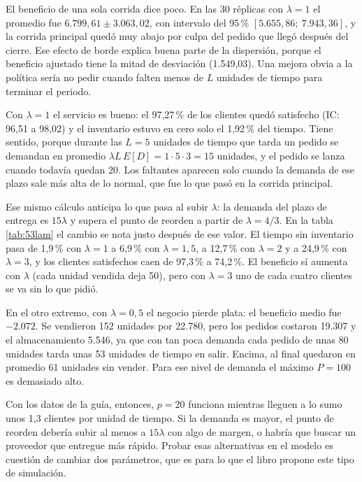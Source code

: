 \documentclass[11pt,letterpaper]{article}
\begin{document}
El beneficio de una sola corrida dice poco. En las 30 réplicas con $\lambda = 1$ el promedio fue
$6.799{,}61 \pm 3.063{,}02$, con intervalo del 95\,\% $[5.655{,}86;\ 7.943{,}36]$, y la corrida principal quedó muy
abajo por culpa del pedido que llegó después del cierre. Ese efecto de borde explica buena parte de la
dispersión, porque el beneficio ajustado tiene la mitad de desviación (1.549,03). Una mejora obvia a la política
sería no pedir cuando falten menos de $L$ unidades de tiempo para terminar el periodo.

Con $\lambda = 1$ el servicio es bueno: el 97,27\,\% de los clientes quedó satisfecho (IC: 96,51 a 98,02) y el
inventario estuvo en cero solo el 1,92\,\% del tiempo. Tiene sentido, porque durante las $L = 5$ unidades de tiempo
que tarda un pedido se demandan en promedio $\lambda L\,E[D] = 1 \cdot 5 \cdot 3 = 15$ unidades, y el pedido se
lanza cuando todavía quedan 20. Los faltantes aparecen solo cuando la demanda de ese plazo sale más alta de lo
normal, que fue lo que pasó en la corrida principal.

Ese mismo cálculo anticipa lo que pasa al subir $\lambda$: la demanda del plazo de entrega es $15\lambda$ y supera
el punto de reorden a partir de $\lambda = 4/3$. En la tabla \ref{tab:53lam} el cambio se nota justo después de
ese valor. El tiempo sin inventario pasa de 1,9\,\% con $\lambda = 1$ a 6,9\,\% con $\lambda = 1{,}5$, a 12,7\,\%
con $\lambda = 2$ y a 24,9\,\% con $\lambda = 3$, y los clientes satisfechos caen de 97,3\,\% a 74,2\,\%. El
beneficio sí aumenta con $\lambda$ (cada unidad vendida deja 50), pero con $\lambda = 3$ uno de cada cuatro
clientes se va sin lo que pidió.

En el otro extremo, con $\lambda = 0{,}5$ el negocio pierde plata: el beneficio medio fue $-2.072$. Se vendieron
152 unidades por 22.780, pero los pedidos costaron 19.307 y el almacenamiento 5.546, ya que con tan poca demanda
cada pedido de unas 80 unidades tarda unas 53 unidades de tiempo en salir. Encima, al final quedaron en promedio
61 unidades sin vender. Para ese nivel de demanda el máximo $P = 100$ es demasiado alto.

Con los datos de la guía, entonces, $p = 20$ funciona mientras lleguen a lo sumo unos 1,3 clientes por unidad de
tiempo. Si la demanda es mayor, el punto de reorden debería subir al menos a $15\lambda$ con algo de margen, o
habría que buscar un proveedor que entregue más rápido. Probar esas alternativas en el modelo es cuestión de
cambiar dos parámetros, que es para lo que el libro propone este tipo de simulación.
\end{document}
